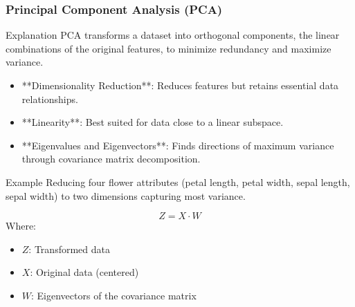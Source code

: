 \documentclass[aspectratio=169]{beamer}
\begin{document}
\begin{frame}[fragile]
    \frametitle{Principal Component Analysis (PCA)}
    
    \begin{block}{Explanation}
        PCA transforms a dataset into orthogonal components, the linear combinations of the original features, to minimize redundancy and maximize variance.
    \end{block}
    
    \begin{itemize}
        \item **Dimensionality Reduction**: Reduces features but retains essential data relationships.
        \item **Linearity**: Best suited for data close to a linear subspace.
        \item **Eigenvalues and Eigenvectors**: Finds directions of maximum variance through covariance matrix decomposition.
    \end{itemize}

    \begin{block}{Example}
        Reducing four flower attributes (petal length, petal width, sepal length, sepal width) to two dimensions capturing most variance.
    \end{block}

    \begin{equation}
        Z = X \cdot W
    \end{equation}
    Where:
    \begin{itemize}
        \item $Z$: Transformed data
        \item $X$: Original data (centered)
        \item $W$: Eigenvectors of the covariance matrix
    \end{itemize}
\end{frame}
\end{document}
